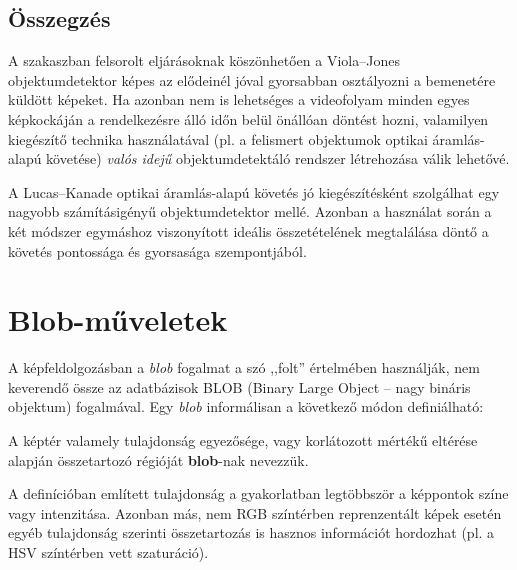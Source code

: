 \subsection{Összegzés}\label{sect:detect_osszefoglalas}

A  szakaszban felsorolt eljárásoknak köszönhetően a Viola--Jones objektumdetektor képes az elődeinél jóval gyorsabban osztályozni a bemenetére küldött képeket. Ha azonban nem is lehetséges a videofolyam minden egyes képkockáján a rendelkezésre álló időn belül önállóan döntést hozni, valamilyen kiegészítő technika használatával (pl. a felismert objektumok optikai áramlás-alapú követése) \emph{valós idejű} objektumdetektáló rendszer létrehozása válik lehetővé.

A Lucas--Kanade optikai áramlás-alapú követés jó kiegészítésként szolgálhat egy nagyobb számításigényű objektumdetektor mellé. Azonban a használat során a két módszer egymáshoz viszonyított ideális összetételének megtalálása döntő a követés pontossága és gyorsasága szempontjából. 




\newpage
\section{Blob-műveletek}\label{sect:blob}

A képfeldolgozásban a \emph{blob} fogalmat a szó ,,folt'' értelmében használják, nem keverendő össze az adatbázisok BLOB (Binary Large Object -- nagy bináris objektum) fogalmával. Egy \emph{blob} informálisan a következő módon definiálható:

\begin{definition}
A képtér valamely tulajdonság egyezősége, vagy korlátozott mértékű eltérése alapján összetartozó régióját \textbf{blob}-nak nevezzük.
\end{definition}

A definícióban említett tulajdonság a gyakorlatban legtöbbször a képpontok színe vagy intenzitása. Azonban más, nem RGB színtérben reprenzentált képek esetén egyéb tulajdonság szerinti összetartozás is hasznos információt hordozhat (pl. a HSV színtérben vett szaturáció).

\bigskip

